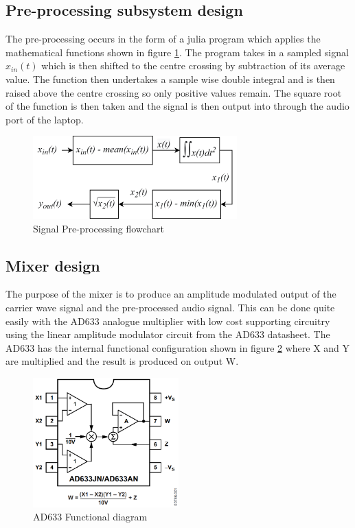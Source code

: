 \subsection{Pre-processing subsystem design}
The pre-processing occurs in the form of a julia program which applies the mathematical functions shown in figure \ref{fig:sigpreprocessflow}. The program takes in a sampled signal $x_{in}(t)$ which is then shifted to the centre crossing by subtraction of its average value. The function then undertakes a sample wise double integral and is then raised above the centre crossing so only positive values remain. The square root of the function is then taken and the signal is then output into through the audio port of the laptop.
\begin{figure}[ht!]
    \centering
    \includegraphics[width=0.7\textwidth]{Figures/Design/Preprocessing Design.png}
    \caption{Signal Pre-processing flowchart}
    \label{fig:sigpreprocessflow}
\end{figure}


\subsection{Mixer design}
The purpose of the mixer is to produce an amplitude modulated output of the carrier wave signal and the pre-processed audio signal. This can be done quite easily with the AD633 analogue multiplier with low cost supporting circuitry using the linear amplitude modulator circuit from the AD633 datasheet. The AD633 has the internal functional configuration shown in figure \ref{fig:mixerfunc} where X and Y are multiplied and the result is produced on output W.

\begin{figure}[ht!]
    \centering
    \includegraphics[width=0.5\textwidth]{Figures/Design/Mixer/ad633Intr.png}
    \caption{AD633 Functional diagram}
    \label{fig:mixerfunc}
\end{figure}

